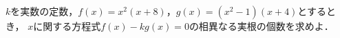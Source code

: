 \documentclass[../../main.tex]{subfiles}
\begin{document}
$k$を実数の定数，$f(x)=x^2(x+8)$，$g(x)=(x^2-1)(x+4)$とするとき，
$x$に関する方程式$f(x)-kg(x)=0$の相異なる実根の個数を求めよ．
\end{document}
